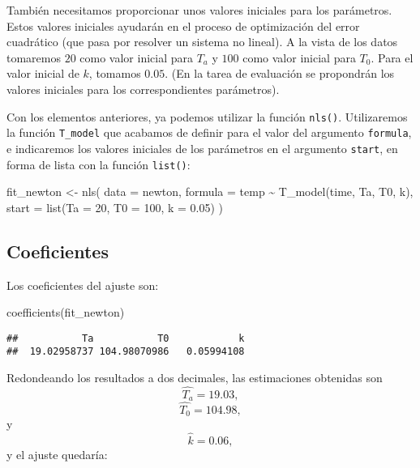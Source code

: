 \documentclass[
  degree=mecinf,
  title=normal,
  toc=normal,
  bib=normal]{mnye}
\newenvironment{Shaded}{\begin{snugshade}}{\end{snugshade}}
\newcommand{\AttributeTok}[1]{\textcolor[rgb]{0.77,0.63,0.00}{#1}}
\newcommand{\DecValTok}[1]{\textcolor[rgb]{0.00,0.00,0.81}{#1}}
\newcommand{\FloatTok}[1]{\textcolor[rgb]{0.00,0.00,0.81}{#1}}
\newcommand{\FunctionTok}[1]{\textcolor[rgb]{0.00,0.00,0.00}{#1}}
\newcommand{\NormalTok}[1]{#1}
\newcommand{\OtherTok}[1]{\textcolor[rgb]{0.56,0.35,0.01}{#1}}
\newcommand{\SpecialCharTok}[1]{\textcolor[rgb]{0.00,0.00,0.00}{#1}}
\begin{document}
También necesitamos proporcionar unos valores iniciales para los parámetros. Estos valores iniciales ayudarán en el proceso de optimización del error cuadrático (que pasa por resolver un sistema no lineal). A la vista de los datos tomaremos \(20\) como valor inicial para \(T_a\) y \(100\) como valor inicial para \(T_0\). Para el valor inicial de \(k\), tomamos \(0.05\). (En la tarea de evaluación se propondrán los valores iniciales para los correspondientes parámetros).

Con los elementos anteriores, ya podemos utilizar la función \texttt{nls()}. Utilizaremos la función \texttt{T\_model} que acabamos de definir para el valor del argumento \texttt{formula}, e indicaremos los valores iniciales de los parámetros en el argumento \texttt{start}, en forma de lista con la función \texttt{list()}:

\begin{Shaded}
\begin{Highlighting}[]
\NormalTok{fit\_newton }\OtherTok{\textless{}{-}} \FunctionTok{nls}\NormalTok{(}
    \AttributeTok{data =}\NormalTok{ newton, }
    \AttributeTok{formula =}\NormalTok{ temp }\SpecialCharTok{\textasciitilde{}} \FunctionTok{T\_model}\NormalTok{(time, Ta, T0, k),}
    \AttributeTok{start =} \FunctionTok{list}\NormalTok{(}\AttributeTok{Ta =} \DecValTok{20}\NormalTok{, }\AttributeTok{T0 =} \DecValTok{100}\NormalTok{,  }\AttributeTok{k =} \FloatTok{0.05}\NormalTok{)}
\NormalTok{)}
\end{Highlighting}
\end{Shaded}

\hypertarget{coeficientes-1}{%
\subsection{Coeficientes}\label{coeficientes-1}}

Los coeficientes del ajuste son:

\begin{Shaded}
\begin{Highlighting}[]
\FunctionTok{coefficients}\NormalTok{(fit\_newton)}
\end{Highlighting}
\end{Shaded}

\begin{verbatim}
##           Ta           T0            k 
##  19.02958737 104.98070986   0.05994108
\end{verbatim}

Redondeando los resultados a dos decimales, las estimaciones obtenidas son
\[\hat{T_a} = 19.03,\]
\[\hat{T_0}=104.98,\]
y
\[\hat{k}=0.06,\]
y el ajuste quedaría:
\end{document}
